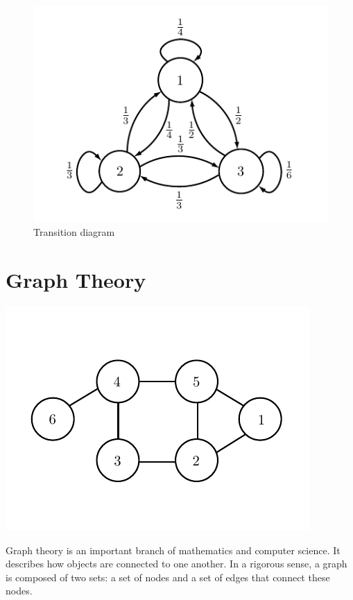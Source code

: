 \begin{figure}[h!]
\begin{center}
\includegraphics[scale = 1]{markov2}
\end{center}
\caption{Transition diagram}
\end{figure}

\newpage

\section*{Graph Theory}
\begin{center}
\includegraphics[scale = .8]{graphExample}
\end{center}

Graph theory is an important branch of mathematics and computer science. It describes how objects are connected to one another. In a rigorous sense, a graph is composed of two sets: a set of nodes and a set of edges that connect these nodes. 

